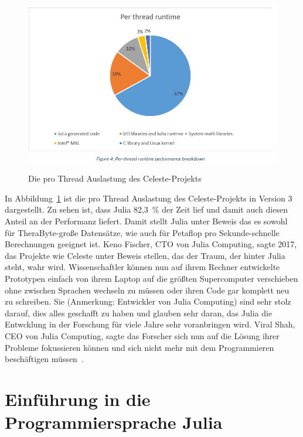 \documentclass[proseminar,german,utf8]{zihpub}
\begin{document}
\begin{figure}[hbt!]
  \centering
  \includegraphics[scale=0.65, trim={5mm 10mm 5mm 5mm},clip]{bilder/celestejulia.png}
  \caption{Die pro Thread Auslastung des Celeste-Projekts}
  \cite{CelesteNextPlatform}
  \label{fig:celestejulia}
\end{figure}

In Abbildung~\ref{fig:celestejulia} ist die pro Thread Auslastung des Celeste-Projekts in Version 3 dargestellt. Zu sehen ist, dass Julia 82,3~\% der Zeit lief und damit auch diesen Anteil an der Performanz liefert. Damit stellt Julia unter Beweis das es sowohl für TheraByte-große Datensätze, wie auch für Petaflop pro Sekunde-schnelle Berechnungen geeignet ist. Keno Fischer, CTO von Julia Computing, sagte 2017, das Projekte wie Celeste unter Beweis stellen, das der Traum, der hinter Julia steht, wahr wird. Wissenschaftler können nun auf ihrem Rechner entwickelte Prototypen einfach von ihrem Laptop auf die größten Supercomputer verschieben ohne zwischen Sprachen wechseln zu müssen oder ihren Code gar komplett neu zu schreiben. Sie (Anmerkung: Entwickler von Julia Computing) sind sehr stolz darauf, dies alles geschafft zu haben und glauben sehr daran, das Julia die Entwcklung in der Forschung für viele Jahre sehr voranbringen wird. Viral Shah, CEO von Julia Computing, sagte das Forscher sich nun auf die Lösung ihrer Probleme fokussieren können und sich nicht mehr mit dem Programmieren beschäftigen müssen~\cite{CelesteV2}.

\section{Einführung in die Programmiersprache Julia}
\end{document}
